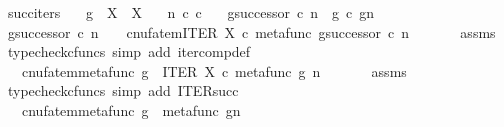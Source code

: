 \begin{isabellebody}
%
\isadelimproof
\isanewline
%
\endisadelimproof
\isanewline
{}\isamarkupfalse%
\ succ{\isacharunderscore}{\kern0pt}iters{\isacharcolon}{\kern0pt}\isanewline
\ \ \ {\isachardoublequoteopen}g\ {\isacharcolon}{\kern0pt}\ X\ {\isasymrightarrow}\ X{\isachardoublequoteclose}\isanewline
\ \ \ {\isachardoublequoteopen}n\ {\isasymin}\isactrlsub c\ {\isasymnat}\isactrlsub c{\isachardoublequoteclose}\isanewline
\ \ \ {\isachardoublequoteopen}g\isactrlbsup {\isasymcirc}{\isacharparenleft}{\kern0pt}successor\ {\isasymcirc}\isactrlsub c\ n{\isacharparenright}{\kern0pt}\isactrlesup \ {\isacharequal}{\kern0pt}\ g\ {\isasymcirc}\isactrlsub c\ {\isacharparenleft}{\kern0pt}g\isactrlbsup {\isasymcirc}n\isactrlesup {\isacharparenright}{\kern0pt}{\isachardoublequoteclose}\ \ \ \ \isanewline
%
\isadelimproof
%
\endisadelimproof
%
\isatagproof
{}\isamarkupfalse%
\ {\isacharminus}{\kern0pt}\ \isanewline
\ \ \isamarkupfalse%
\ {\isachardoublequoteopen}g\isactrlbsup {\isasymcirc}successor\ {\isasymcirc}\isactrlsub c\ n\isactrlesup \ \ \ {\isacharequal}{\kern0pt}\ cnufatem{\isacharparenleft}{\kern0pt}ITER\ X\ {\isasymcirc}\isactrlsub c\ {\isasymlangle}metafunc\ g{\isacharcomma}{\kern0pt}successor\ {\isasymcirc}\isactrlsub c\ n\ {\isasymrangle}{\isacharparenright}{\kern0pt}{\isachardoublequoteclose}\isanewline
\ \ \ \ \isamarkupfalse%
\ assms\ \isamarkupfalse%
\ {\isacharparenleft}{\kern0pt}typecheck{\isacharunderscore}{\kern0pt}cfuncs{\isacharcomma}{\kern0pt}\ simp\ add{\isacharcolon}{\kern0pt}\ iter{\isacharunderscore}{\kern0pt}comp{\isacharunderscore}{\kern0pt}def{}{\isacharparenright}{\kern0pt}\isanewline
\ \ \isamarkupfalse%
\ \isamarkupfalse%
\ {\isachardoublequoteopen}{\isachardot}{\kern0pt}{\isachardot}{\kern0pt}{\isachardot}{\kern0pt}\ {\isacharequal}{\kern0pt}\ cnufatem{\isacharparenleft}{\kern0pt}metafunc\ g\ {\isasymbox}\ ITER\ X\ {\isasymcirc}\isactrlsub c\ {\isasymlangle}metafunc\ g{\isacharcomma}{\kern0pt}\ n\ {\isasymrangle}{\isacharparenright}{\kern0pt}{\isachardoublequoteclose}\isanewline
\ \ \ \ \isamarkupfalse%
\ assms\ \isamarkupfalse%
\ {\isacharparenleft}{\kern0pt}typecheck{\isacharunderscore}{\kern0pt}cfuncs{\isacharcomma}{\kern0pt}\ simp\ add{\isacharcolon}{\kern0pt}\ ITER{\isacharunderscore}{\kern0pt}succ{\isacharparenright}{\kern0pt}\isanewline
\ \ \isamarkupfalse%
\ \isamarkupfalse%
\ {\isachardoublequoteopen}{\isachardot}{\kern0pt}{\isachardot}{\kern0pt}{\isachardot}{\kern0pt}\ {\isacharequal}{\kern0pt}\ cnufatem{\isacharparenleft}{\kern0pt}metafunc\ g\ {\isasymbox}\ metafunc\ {\isacharparenleft}{\kern0pt}g\isactrlbsup {\isasymcirc}n\isactrlesup {\isacharparenright}{\kern0pt}{\isacharparenright}{\kern0pt}{\isachardoublequoteclose}\isanewline

\end{isabellebody}

